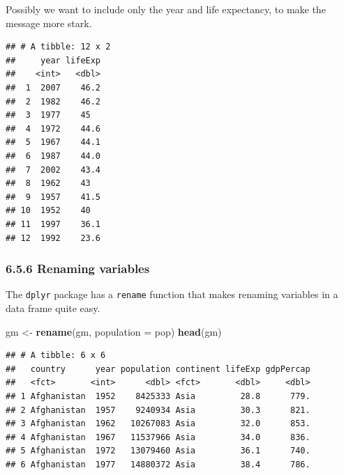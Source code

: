 \documentclass[]{article}
\newenvironment{Shaded}{\begin{snugshade}}{\end{snugshade}}
\newcommand{\KeywordTok}[1]{\textcolor[rgb]{0.13,0.29,0.53}{\textbf{#1}}}
\newcommand{\DataTypeTok}[1]{\textcolor[rgb]{0.13,0.29,0.53}{#1}}
\newcommand{\StringTok}[1]{\textcolor[rgb]{0.31,0.60,0.02}{#1}}
\newcommand{\OperatorTok}[1]{\textcolor[rgb]{0.81,0.36,0.00}{\textbf{#1}}}
\newcommand{\NormalTok}[1]{#1}
\begin{document}
Possibly we want to include only the year and life expectancy, to make
the message more stark.

\begin{Shaded}
\end{Shaded}

\begin{verbatim}
## # A tibble: 12 x 2
##     year lifeExp
##    <int>   <dbl>
##  1  2007    46.2
##  2  1982    46.2
##  3  1977    45  
##  4  1972    44.6
##  5  1967    44.1
##  6  1987    44.0
##  7  2002    43.4
##  8  1962    43  
##  9  1957    41.5
## 10  1952    40  
## 11  1997    36.1
## 12  1992    23.6
\end{verbatim}

\subsubsection{6.5.6 Renaming variables}\label{renaming-variables}

The \texttt{dplyr} package has a \texttt{rename} function that makes
renaming variables in a data frame quite easy.

\begin{Shaded}
\begin{Highlighting}[]
\NormalTok{gm <-}\StringTok{ }\KeywordTok{rename}\NormalTok{(gm, }\DataTypeTok{population =}\NormalTok{ pop)}
\KeywordTok{head}\NormalTok{(gm)}
\end{Highlighting}
\end{Shaded}

\begin{verbatim}
## # A tibble: 6 x 6
##   country      year population continent lifeExp gdpPercap
##   <fct>       <int>      <dbl> <fct>       <dbl>     <dbl>
## 1 Afghanistan  1952    8425333 Asia         28.8      779.
## 2 Afghanistan  1957    9240934 Asia         30.3      821.
## 3 Afghanistan  1962   10267083 Asia         32.0      853.
## 4 Afghanistan  1967   11537966 Asia         34.0      836.
## 5 Afghanistan  1972   13079460 Asia         36.1      740.
## 6 Afghanistan  1977   14880372 Asia         38.4      786.
\end{verbatim}
\end{document}
